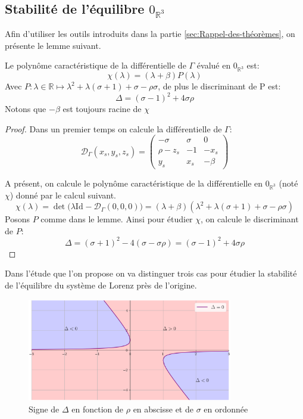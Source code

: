 \documentclass{article}
\newcommand{\R}{\mathbb{R}}
\newcommand{\id}[1][]{\ensuremath{\mathrm{Id}_{#1}}}
\newtheorem[M , nocut]{prop}{Proposition}[section]
\newtheorem[M , nocut]{definition}{Définition}
\newtheorem[M , nocut]{lemme}{Lemme}
\newtheorem[L , nocut]{thm}{Théoreme}
\newtheorem[M , nocut]{cor}{Corollaire}
\begin{document}
\subsection{Stabilité de l'équilibre $0_{\R^3}$}
Afin d'utiliser les outils introduits dans la partie \ref{sec:Rappel-des-théorèmes}, on présente le lemme suivant.
\begin{lemme}[préliminaire]
    Le polynôme caractéristique de la différentielle de $\Gamma$ évalué en $0_{\R^3}$ est:
    $$ \chi(\lambda) = (\lambda + \beta)P(\lambda)$$
    Avec $P:\lambda \in \R \mapsto \lambda^2 + \lambda(\sigma+1)+\sigma-\rho\sigma$, de plus le discriminant de P est:
    $$ \Delta = (\sigma-1)^2 +4\sigma\rho $$
    Notons que $-\beta$ est toujours racine de $\chi$
\end{lemme}

\begin{proof}
Dans un premier temps on calcule la différentielle de $\Gamma$:
\begin{equation}
    \label{eq:diff}
    \mathcal{D}_\Gamma(x_s,y_s,z_s) = 
    \left(\begin{array}{ccc}
        -\sigma & \sigma & 0\\
        \rho- z_s & -1 & -x_s\\
        y_s & x_s & -\beta
    \end{array}\right)
\end{equation}

A présent, on calcule le polynôme caractéristique de la différentielle en $0_{\R^3}$ (noté $\chi$) donné par le calcul suivant.
\[
    \chi (\lambda) = \det\big(\lambda\id - \mathcal{D}_{\Gamma}(0,0,0)\big) = (\lambda + \beta)(\lambda^2 + \lambda(\sigma+1)+\sigma-\rho\sigma)
\]
Posons $P$ comme dans le lemme. Ainsi pour étudier $\chi$, on calcule le discriminant de $P$:
\[
  \Delta = (\sigma+1)^2 - 4(\sigma-\sigma\rho) = (\sigma-1)^2 +4\sigma\rho
\]
\end{proof}

Dans l'étude que l'on propose on va distinguer trois cas pour étudier la stabilité de l'équilibre du système de Lorenz près de l'origine.
\begin{figure}[ht]
    \centering
    \includegraphics[width=0.8\textwidth]{DeltaDomain}
    \caption{Signe de $\Delta$ en fonction de $\rho$ en abscisse et de $\sigma$ en ordonnée}
    \label{fig:signD}
\end{figure}
\end{document}
